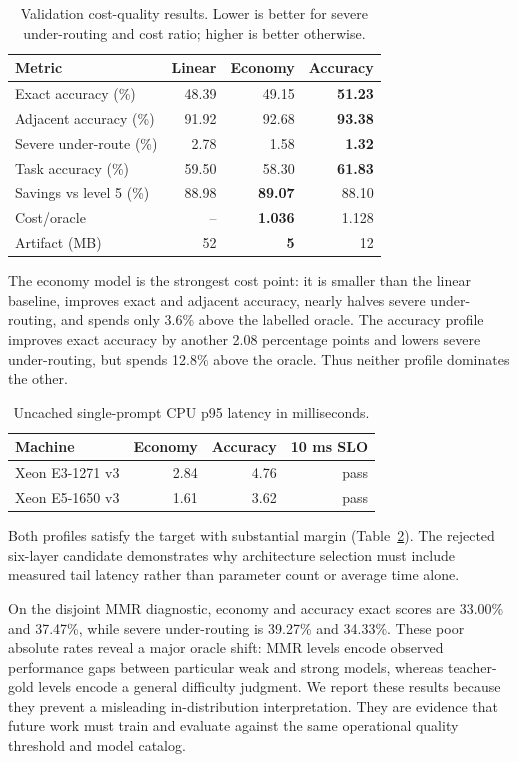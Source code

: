 \documentclass[10pt,twocolumn]{article}
\begin{document}
\begin{table}[t]
\centering
\caption{Validation cost-quality results. Lower is better for severe
under-routing and cost ratio; higher is better otherwise.}
\label{tab:results}
\small
\begin{tabular}{lrrr}
\toprule
Metric & Linear & Economy & Accuracy \\
\midrule
Exact accuracy (\%) & 48.39 & 49.15 & \textbf{51.23} \\
Adjacent accuracy (\%) & 91.92 & 92.68 & \textbf{93.38} \\
Severe under-route (\%) & 2.78 & 1.58 & \textbf{1.32} \\
Task accuracy (\%) & 59.50 & 58.30 & \textbf{61.83} \\
Savings vs level 5 (\%) & 88.98 & \textbf{89.07} & 88.10 \\
Cost/oracle & -- & \textbf{1.036} & 1.128 \\
Artifact (MB) & 52 & \textbf{5} & 12 \\
\bottomrule
\end{tabular}
\end{table}

The economy model is the strongest cost point: it is smaller than the linear
baseline, improves exact and adjacent accuracy, nearly halves severe
under-routing, and spends only 3.6\% above the labelled oracle. The accuracy
profile improves exact accuracy by another 2.08 percentage points and lowers
severe under-routing, but spends 12.8\% above the oracle. Thus neither profile
dominates the other.

\begin{table}[t]
\centering
\caption{Uncached single-prompt CPU p95 latency in milliseconds.}
\label{tab:latency}
\small
\begin{tabular}{lrrr}
\toprule
Machine & Economy & Accuracy & 10 ms SLO \\
\midrule
Xeon E3-1271 v3 & 2.84 & 4.76 & pass \\
Xeon E5-1650 v3 & 1.61 & 3.62 & pass \\
\bottomrule
\end{tabular}
\end{table}

Both profiles satisfy the target with substantial margin
(Table~\ref{tab:latency}). The rejected six-layer candidate demonstrates why
architecture selection must include measured tail latency rather than parameter
count or average time alone.

On the disjoint MMR diagnostic, economy and accuracy exact scores are 33.00\% and
37.47\%, while severe under-routing is 39.27\% and 34.33\%. These poor absolute
rates reveal a major oracle shift: MMR levels encode observed performance gaps
between particular weak and strong models, whereas teacher-gold levels encode a
general difficulty judgment. We report these results because they prevent a
misleading in-distribution interpretation. They are evidence that future work
must train and evaluate against the same operational quality threshold and model
catalog.
\end{document}
